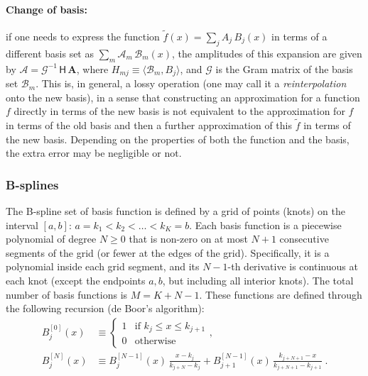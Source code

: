 \documentclass[12pt]{article}
\let\oldparagraph\paragraph
\renewcommand{\paragraph}[1]{\vspace{-2mm}\oldparagraph{#1}}
\begin{document}
\paragraph{Change of basis:}  \label{sec:MathBasisSetChange}
if one needs to express the function $\tilde f(x) = \sum_j A_j\, B_j(x)$ in terms of a different basis set as $\sum_m \mathcal A_m\, \mathcal B_m(x)$, the amplitudes of this expansion are given by $\boldsymbol{\mathcal A} = \mathcal G^{-1}\, \mathsf H\, \boldsymbol A$, where $H_{mj} \equiv \langle \mathcal B_m, B_j \rangle$, and $\mathcal G$ is the Gram matrix of the basis set $\mathcal B_m$. This is, in general, a lossy operation (one may call it a \textit{reinterpolation} onto the new basis), in a sense that constructing an approximation for a function $f$ directly in terms of the new basis is not equivalent to the approximation for $f$ in terms of the old basis and then a further approximation of this $\tilde f$ in terms of the new basis. Depending on the properties of both the function and the basis, the extra error may be negligible or not.


\subsubsection{B-splines}  \label{sec:MathBSplineDetails}

The B-spline set of basis function is defined by a grid of points (knots) on the interval $[a,b]$: $a=k_1<k_2<\dots<k_K=b$. Each basis function is a piecewise polynomial of degree $N\ge 0$ that is non-zero on at most $N+1$ consecutive segments of the grid (or fewer at the edges of the grid). Specifically, it is a polynomial inside each grid segment, and its $N-1$-th derivative is continuous at each knot (except the endpoints $a,b$, but including all interior knots). The total number of basis functions is $M=K+N-1$. These functions are defined through the following recursion (de Boor's algorithm):
\begin{subequations}
\begin{align}
B^{[0]}_j(x) &\equiv \left\{ \begin{array}{ll} 1 &\mbox{if }k_j \le x \le k_{j+1} \\ 0 & \mbox{otherwise} \end{array} \right., \\
B^{[N]}_j(x) &\equiv B^{[N-1]}_j(x)\,\frac{x-k_j}{k_{j+N}-k_j} +
B^{[N-1]}_{j+1}(x)\,\frac{k_{j+N+1}-x}{k_{j+N+1}-k_{j+1}} \;.
\end{align}
\end{subequations}
\end{document}
